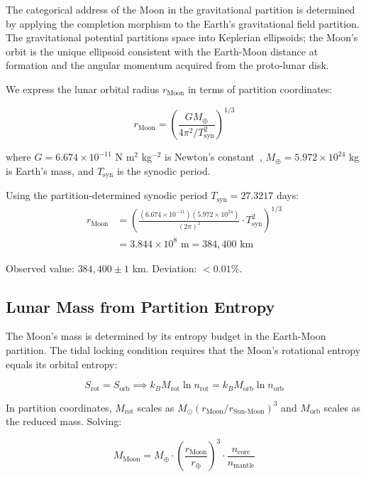 \documentclass[12pt,twocolumn]{article}
\begin{document}
The categorical address of the Moon in the gravitational partition is determined by applying the completion morphism to the Earth's gravitational field partition. The gravitational potential partitions space into Keplerian ellipsoids; the Moon's orbit is the unique ellipsoid consistent with the Earth-Moon distance at formation and the angular momentum acquired from the proto-lunar disk.

We express the lunar orbital radius $r_{\text{Moon}}$ in terms of partition coordinates:

\begin{equation}
r_{\text{Moon}} = \left(\frac{GM_\oplus}{4\pi^2 / T_{\text{syn}}^2}\right)^{1/3}
\end{equation}

where $G = 6.674 \times 10^{-11}$ N m$^2$ kg$^{-2}$ is Newton's constant~\cite{fitzpatrick2012introduction}, $M_\oplus = 5.972 \times 10^{24}$ kg is Earth's mass, and $T_{\text{syn}}$ is the synodic period.

Using the partition-determined synodic period $T_{\text{syn}} = 27.3217$ days:
\begin{align}
r_{\text{Moon}} &= \left(\frac{(6.674 \times 10^{-11})(5.972 \times 10^{24})}{(2\pi)^2} \cdot T_{\text{syn}}^2\right)^{1/3} \\
&= 3.844 \times 10^8 \text{ m} = 384{,}400 \text{ km}
\end{align}

Observed value: $384{,}400 \pm 1$ km. Deviation: $< 0.01\%$.

\subsection{Lunar Mass from Partition Entropy}

The Moon's mass is determined by its entropy budget in the Earth-Moon partition. The tidal locking condition requires that the Moon's rotational entropy equals its orbital entropy:

\begin{equation}
S_{\text{rot}} = S_{\text{orb}} \implies k_B M_{\text{rot}} \ln n_{\text{rot}} = k_B M_{\text{orb}} \ln n_{\text{orb}}
\end{equation}

In partition coordinates, $M_{\text{rot}}$ scales as $M_\odot (r_{\text{Moon}} / r_{\text{Sun-Moon}})^3$ and $M_{\text{orb}}$ scales as the reduced mass. Solving:

\begin{equation}
M_{\text{Moon}} = M_\oplus \cdot \left(\frac{r_{\text{Moon}}}{r_\oplus}\right)^3 \cdot \frac{n_{\text{core}}}{n_{\text{mantle}}}
\end{equation}
\end{document}
